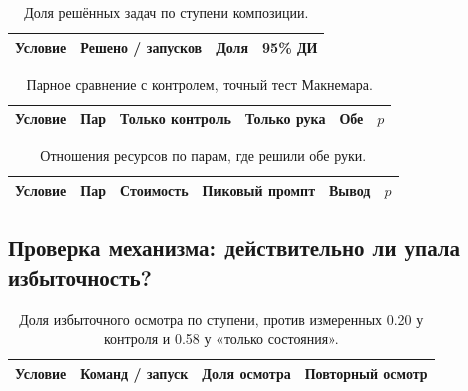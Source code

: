 \begin{table}[t]
\centering
\caption{Доля решённых задач по ступени композиции.}
\label{tab:ladder-solve}
\begin{tabular}{@{}lrrr@{}}
\toprule
Условие & Решено / запусков & Доля & 95\% ДИ \\
\midrule

\bottomrule
\end{tabular}
\end{table}

\begin{table}[t]
\centering
\caption{Парное сравнение с контролем, точный тест Макнемара.}
\label{tab:ladder-paired}
\begin{tabular}{@{}lrrrrr@{}}
\toprule
Условие & Пар & Только контроль & Только рука & Обе & $p$ \\
\midrule

\bottomrule
\end{tabular}
\end{table}

\begin{table}[t]
\centering
\caption{Отношения ресурсов по парам, где решили обе руки.}
\label{tab:ladder-cost}
\begin{tabular}{@{}lrrrrr@{}}
\toprule
Условие & Пар & Стоимость & Пиковый промпт & Вывод & $p$ \\
\midrule

\bottomrule
\end{tabular}
\end{table}


\subsection{Проверка механизма: действительно ли упала избыточность?}

\begin{table}[t]
\centering
\caption{Доля избыточного осмотра по ступени, против измеренных \num{0.20}
у контроля и \num{0.58} у «только состояния».}
\label{tab:ladder-redundancy}
\begin{tabular}{@{}lrrr@{}}
\toprule
Условие & Команд / запуск & Доля осмотра & Повторный осмотр \\
\midrule

\bottomrule
\end{tabular}
\end{table}


